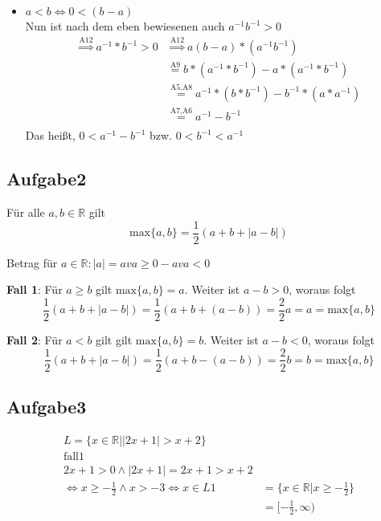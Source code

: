 \documentclass{article}
\begin{document}
\begin{enumerate}[(a)]
\begin{itemize}
  \item $a < b \iff 0 < (b - a)$ \\
    Nun ist nach dem eben bewiesenen auch $a^{-1}b^{-1} > 0$
    \begin{align*}
      \overset{\text{A12}}\Rightarrow a^{-1} * b^{-1} > 0 &\overset{\text{A12}}\Rightarrow a(b - a) * (a^{-1}b^{-1}) \\
      &\overset{\text{A9}}= b * (a^{-1} * b^{-1}) -  a * (a^{-1} * b^{-1}) \\
      &\overset{\text{A5,A8}}= a^{-1} * (b * b^{-1}) -  b^{-1} * (a * a^{-1}) \\
      &\overset{\text{A7,A6}}= a^{-1} - b^{-1} \\
    \end{align*}
    Das heißt, $0 < a^{-1} - b^{-1}$ bzw. $0 < b^{-1} < a^{-1}$
  \end{itemize}
\end{enumerate}
\subsection*{Aufgabe2}
Für alle $a,b \in \mathbb{R}$ gilt
\[
  \text{max}\{a,b\} = \frac{1}{2}(a + b + |a - b|)
\]

Betrag für $a \in \mathbb{R} \colon |a| = a v a\geq 0 -a v a < 0$
  
\textbf{Fall 1}: Für $a \geq b$ gilt $\text{max}\{a,b\} = a$. Weiter ist $a - b > 0$, woraus folgt
\[
  \frac{1}{2}(a + b + |a - b|) = \frac{1}{2}(a + b + (a - b)) = \frac{2}{2} a = a = \text{max}\{a,b\}
\]

\textbf{Fall 2}: Für $a < b$ gilt gilt $\text{max}\{a,b\} = b$. Weiter ist $a - b < 0$, woraus folgt
\[
  \frac{1}{2}(a + b + |a - b|) = \frac{1}{2}(a + b - (a - b)) = \frac{2}{2} b = b = \text{max}\{a,b\}
\]

\subsection*{Aufgabe3}
  
\begin{align*}
  L = \{ x \in \mathbb{R} | |2x+1| > x + 2\} \\
  \text{fall1} \\
  2x + 1 > 0 \land |2x+1| = 2x+1 > x+2\\
  \iff x \geq -\frac{1}{2} \land x > -3 \iff x \in L1 &= \{ x \in \mathbb{R} | x \geq -\frac{1}{2} \} \\
                                                      &= [-\frac{1}{2}, \infty) \\
\end{align*}
\end{document}
